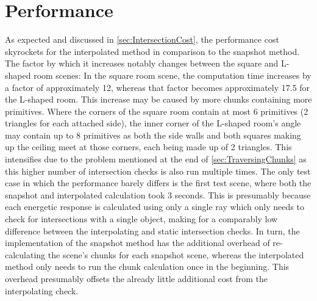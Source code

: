 \section{Performance}

As expected and discussed in \autoref{sec:IntersectionCost},
the performance cost skyrockets for the interpolated method in comparison to the snapshot method.
The factor by which it increases notably changes between the square and L-shaped room scenes:
In the square room scene, the computation time increases by a factor of approximately 12,
whereas that factor becomes approximately 17.5 for the L-shaped room.
\newline
This increase may be caused by more chunks containing more primitives.
Where the corners of the square room contain at most 6 primitives (2 triangles for each attached side),
the inner corner of the L-shaped room's angle may contain up to 8 primitives
as both the side walls and both squares making up the ceiling meet at those corners,
each being made up of 2 triangles.
This intensifies due to the problem mentioned at the end of \autoref{sec:TraversingChunks}
as this higher number of intersection checks is also run multiple times.
\newline
The only test case in which the performance barely differs is the first test scene,
where both the snapshot and interpolated calculation took 3 seconds.
This is presumably because each energetic response is calculated using only a single ray
which only needs to check for intersections with a single object,
making for a comparably low difference between the interpolating and static intersection checks.
\newline
In turn, the implementation of the snapshot method has the additional overhead of re-calculating the scene's chunks for each snapshot scene,
whereas the interpolated method only needs to run the chunk calculation once in the beginning.
This overhead presumably offsets the already little additional cost from the interpolating check.
